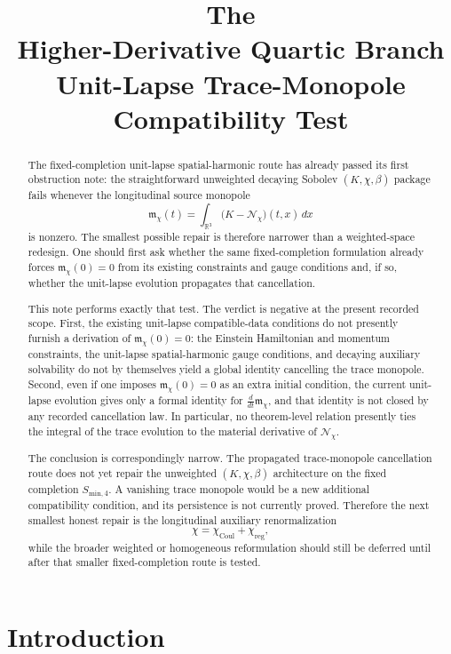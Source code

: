 \documentclass[11pt]{article}
\title{\textbf{The \TheoryName{}}\\[0.4em]
\large Higher-Derivative Quartic Branch Unit-Lapse Trace-Monopole Compatibility Test}
\author{}
\date{}
\begin{document}
\maketitle

\begin{abstract}
The fixed-completion unit-lapse spatial-harmonic route has already passed its first obstruction note: the straightforward unweighted decaying Sobolev \((K,\chi,\beta)\) package fails whenever the longitudinal source monopole
\[
\mathfrak m_\chi(t)
=
\int_{\mathbb R^3}\bigl(K-\mathcal N_\chi\bigr)(t,x)\,dx
\]
is nonzero. The smallest possible repair is therefore narrower than a weighted-space redesign. One should first ask whether the same fixed-completion formulation already forces
\(\mathfrak m_\chi(0)=0\) from its existing constraints and gauge conditions and, if so, whether the unit-lapse evolution propagates that cancellation.

This note performs exactly that test. The verdict is negative at the present recorded scope. First, the existing unit-lapse compatible-data conditions do not presently furnish a derivation of \(\mathfrak m_\chi(0)=0\): the Einstein Hamiltonian and momentum constraints, the unit-lapse spatial-harmonic gauge conditions, and decaying auxiliary solvability do not by themselves yield a global identity cancelling the trace monopole. Second, even if one imposes \(\mathfrak m_\chi(0)=0\) as an extra initial condition, the current unit-lapse evolution gives only a formal identity for \(\frac{d}{dt}\mathfrak m_\chi\), and that identity is not closed by any recorded cancellation law. In particular, no theorem-level relation presently ties the integral of the trace evolution to the material derivative of \(\mathcal N_\chi\).

The conclusion is correspondingly narrow. The propagated trace-monopole cancellation route does not yet repair the unweighted \((K,\chi,\beta)\) architecture on the fixed completion \(S_{\mathrm{min},4}\). A vanishing trace monopole would be a new additional compatibility condition, and its persistence is not currently proved. Therefore the next smallest honest repair is the longitudinal auxiliary renormalization
\[
\chi=\chi_{\mathrm{Coul}}+\chi_{\mathrm{reg}},
\]
while the broader weighted or homogeneous reformulation should still be deferred until after that smaller fixed-completion route is tested.
\end{abstract}

\section{Introduction}
\end{document}

